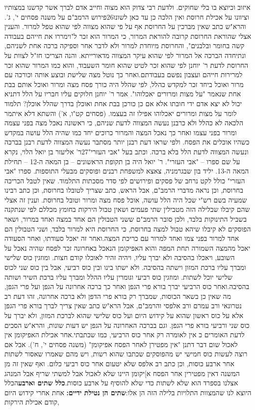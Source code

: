 \documentclass[12pt, openany]{book}
\begin{document}
איזוב וכיוצא בו בלי שחוקים. ולדעת רבי צדוק הוא מצוה וחייב אדם לברך אשר קדשנו במצותיו וציוונו על אכילת חרוסת ואין הלכה כן עד כאן לשונו26פירוש הרמב"ם על משנה פסחים י', ג'. והרא"ש כתב שאין מברכין על החרוסת אף על פי שהוא מצווה לפי שהוא טפל למרור. והענין אצלי שהוראת החרוסת קרובה להוראת המרור, כי המרור הוא זכר ל"וימררו את חייהם בעבודה קשה בחומר ובלבנים", והחרוסת מיוחדת למרור ולא לדבר אחר וספיקה ברכה אחת לשניהם, ונתיחדה הברכה אל המרור לפי שהוא עיקר המצווה מדאורייתא. והנה הצריכו חז"ל לצוות על החרוסת לדעת ר' יוחנן לפי שהוא זכר לטיט שהוא חומר השעבוד, והוא כמו המרור שהוא זכר למרירות חייהם ועצבון נפשם בעבודתם.ואחר כך נוטל מצה שלישת ובוצע אותה וכורכה עם מרור ואוכל ביחד זכר למקדש כהלל, לפי שהלל היה כורך פסח מצה ומרור ואוכל אותם בבת אחת שנאמר "על מצות ומרורים  יאכלוהו". אמר ר' יוחנן חלוקים עליו חבריו על הלל דתניא יכול לא יצא אדם ידי חובתו אלא אם כן כורכן בבת אחת ואוכלן בדרך שהלל אוכלן? תלמוד לומר על מצות ומרורים יאכלוהו אפילו זה בעצמו. (פסחים קט"ו, א') והשתא דלא איתמר הלכאה לא כהלל ולא כרבנן נעשה המצווה לדעת שניהם, כי ראשונה נאכל מצה בפני עצמה ומרור בפני עצמו ואחר כך נאכל המצה והמרור כרוכים יחד כמו שהיה הלל עושה במקדש כשהיו אוכלים את הפסח. ולפי שראו דעת רבנן יותר מסתבר נעשה המצווה לדעת רבנן בברכה ונעשה המצווה לדעת הלל בלא ברכה. וכתב בעל "אבי העזרי"27ר' אליעזר בן יואל הלוי, נקרא על שם ספרו – "אבי העזרי". ר' יואל היה בן תקופת הראשונים – בן המאה ה-12 – תחילת המאה ה-13. יליד בון שבגרמניה, צאצא למשפחת רבנים ופוסקים מבעלי התוספות. ספרו "אבי העזרי" כולל לקט נרחב של פסקים ופירושים לפי סדר מסכתות התלמוד. שאין לטבל הכריכה בחרוסת, וכן נראה מדברי הרמב"ם, אבל הראש, כתב שצריך לטובלו בחרוסת, וכן כתב רבינו שמעיה בשם רש"י שכל היה הלל עושה, אוכל פסח מצה ומרור וטובל בחרוסת. וענין זה אצלי שהם קיבלו שבלילה הזה מטבילין שתי פעמים ושאין טבול הירקות בחומץ מכללם לפי שנתקנה  בשביל התינוקות בלבד, ולכן סובר הרמב"ם ששני הטבולין הם אחד במצה ואחד במרור, ושאר הפוסקים לא קיבלו שיהא טבול למצה בחרוסת, כי החרוסת היא למרור בלבד, ושני הטבולין הם אחד למרור בפני צמו ואחד למרור עם כריכת המצה.ואחר זה יאכל סעודתו, ואחר הסעודה יאכל מהמצה השמורה תחת המפה והוא האפיקומן הנאכל באחרונה זכר לפסח שהיה נאכל על השובע, ויאכלו בהסיבה ולא יברך עליו, ויהיה זהיר לאוכלו קודם חצות. ומוזגין כוס שלישי ומברך עליו ברכת המזון וישתה בהסיבה. ולא ישתו בינו ובין כוס רביעי, אבל בין כוס שני לכוס שלישי יוכל לשתות. ומוזגין כוס רביעי וגומרין עליו ההלל ומברך עליו ברכת השיר ושותה בהסיבה.ואחר כוס הרביעי יברך בורא פרי הגפן ואחר כך ברכה אחרונה על הגפן ועל פרי הגפן, מה שאין כן בשאר הכוסות, שמברך רק בורא פרי הדפן ולא ברכה אחרונה, זהו דעת רב נטרונאי ורב עמרם ורב אלפסי והרמב"ם, אבל הרא"ש כתב שאין צריך לברך בורא פרי הגפן אלא על כוס ראשון שהוא על קידוש היום ועל כוס שלישי שהוא לברכת המזון, ולא יברך על כוס שני ורביעי בורא פרי הגפן. וגם בברכה האחרונה על הגפן יש דעות שונות, והרא"ש הסכים לדעת האומרים כ אין לאומרה רק אחר כוס הרביעי, כמו שכתבתי.אחר אכילת האפיקומן אין לאכול שום דבר דתנן "אין מפטירן לאחר הפסח אפיקומן" (משנה פסחים י', ח'). אבל אם רוצה לעשות כוס חמישי יש מהפוסקים שכתבו שהוא רשות, ויש מהם שאמרו שאסור לשתות אחר ארבע כוסות, וכן כתב רב אלפס שלא יטעום אחר כוס רביעי כלום. ואף שאין זה מן המשנה דאין מפטירין אחר הפסח א]יקומן היינו שלא לאכול אבל למשתי שריף אבל המנהג אצלנו בספרד הוא שלא לשתות כדי שלא להוסיף על ארבע כוסות.\textrm{\textbf{כלל שתים וארבע}}הכלל היוצא לנו שהמצוות התלויות בלילה הזה הן אלו:\textrm{\textbf{שתים הן נטילת ידיים:}} אחת אחרי קידוש היום קודם אכילת הירקות, 
\end{document}
